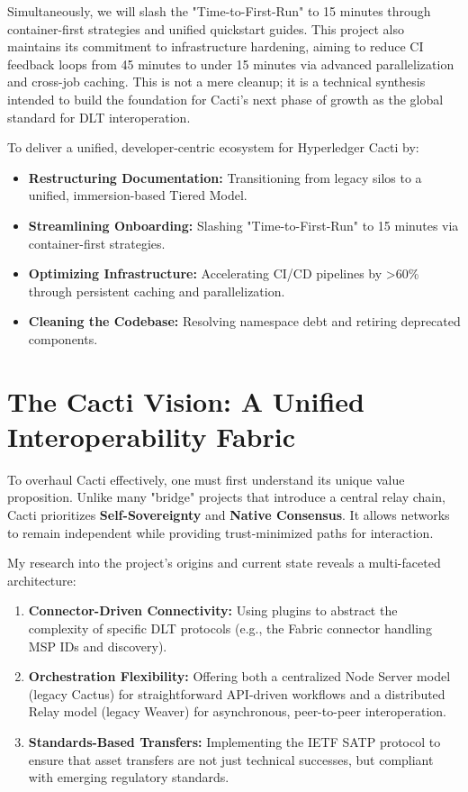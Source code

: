 Simultaneously, we will slash the "Time-to-First-Run" to 15 minutes through container-first strategies and unified quickstart guides. This project also maintains its commitment to infrastructure hardening, aiming to reduce CI feedback loops from 45 minutes to under 15 minutes via advanced parallelization and cross-job caching. This is not a mere cleanup; it is a technical synthesis intended to build the foundation for Cacti's next phase of growth as the global standard for DLT interoperation.

\begin{tcolorbox}[colback=blue!5!white, colframe=blue!60!black,
  title=Core Project Mandate, fonttitle=\bfseries, arc=4pt]
To deliver a unified, developer-centric ecosystem for Hyperledger Cacti by:
\begin{itemize}[leftmargin=*]
    \item \textbf{Restructuring Documentation:} Transitioning from legacy silos to a unified, immersion-based Tiered Model.
    \item \textbf{Streamlining Onboarding:} Slashing "Time-to-First-Run" to 15 minutes via container-first strategies.
    \item \textbf{Optimizing Infrastructure:} Accelerating CI/CD pipelines by >60\% through persistent caching and parallelization.
    \item \textbf{Cleaning the Codebase:} Resolving namespace debt and retiring deprecated components.
\end{itemize}
\end{tcolorbox}

\section{The Cacti Vision: A Unified Interoperability Fabric}

To overhaul Cacti effectively, one must first understand its unique value proposition. Unlike many "bridge" projects that introduce a central relay chain, Cacti prioritizes \textbf{Self-Sovereignty} and \textbf{Native Consensus}. It allows networks to remain independent while providing trust-minimized paths for interaction.

My research into the project's origins and current state reveals a multi-faceted architecture:
\begin{enumerate}[leftmargin=*]
    \item \textbf{Connector-Driven Connectivity:} Using plugins to abstract the complexity of specific DLT protocols (e.g., the Fabric connector handling MSP IDs and discovery).
    \item \textbf{Orchestration Flexibility:} Offering both a centralized Node Server model (legacy Cactus) for straightforward API-driven workflows and a distributed Relay model (legacy Weaver) for asynchronous, peer-to-peer interoperation.
    \item \textbf{Standards-Based Transfers:} Implementing the IETF SATP protocol to ensure that asset transfers are not just technical successes, but compliant with emerging regulatory standards.
\end{enumerate}

